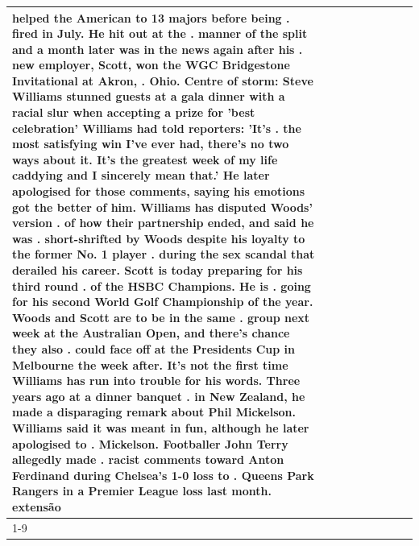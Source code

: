 \begin{table}[H]
\begin{tabular}{lllrlllll}
helped the American to 13 majors before being . fired in July. He hit out at the . manner of the split and a month later was in the news again after his . new employer, Scott, won the WGC Bridgestone Invitational at Akron, . Ohio. Centre of storm: Steve Williams stunned guests at a gala dinner with a racial slur when accepting a prize for 'best celebration' Williams had told reporters: 'It's . the most satisfying win I've ever had, there's no two ways about it. It's the greatest week of my life caddying and I sincerely mean that.' He later apologised for those comments, saying his emotions got the better of him. Williams has disputed Woods' version . of how their partnership ended, and said he was . short-shrifted by Woods despite his loyalty to the former No. 1 player . during the sex scandal that derailed his career. Scott is today preparing for his third round . of the HSBC Champions. He is . going for his second World Golf Championship of the year. Woods and Scott are to be in the same . group next week at the Australian Open, and there's chance they also . could face off at the Presidents Cup in Melbourne the week after. It's not the first time Williams has run into trouble for his words. Three years ago at a dinner banquet . in New Zealand, he made a disparaging remark about Phil Mickelson. Williams said it was meant in fun, although he later apologised to . Mickelson. Footballer John Terry allegedly made . racist comments toward Anton Ferdinand during Chelsea's 1-0 loss to . Queens Park Rangers in a Premier League loss last month. extensão \\
\cline{1-9}

\end{tabular}
\end{table}
